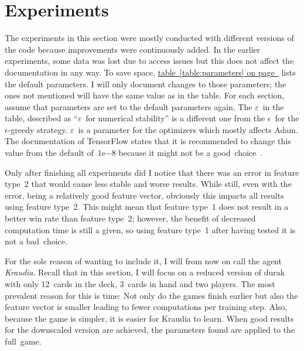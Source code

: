 \documentclass[a4paper,titlepage]{article}
\newcommand{\expn}[2]{{#1}\mathrm{e}{#2}}
\begin{document}
\newpage

\section{Experiments}
\label{sec:experiments}

The experiments in this section were mostly conducted with different versions of the code because improvements were continuously added. In the earlier experiments, some data was lost due to access issues but this does not affect the documentation in any way.
To save space, \hyperref[table:parameters]{table~\ref*{table:parameters} on page~\pageref*{table:parameters}} lists the default parameters.
I will only document changes to those parameters; the ones not mentioned will have the same value as in the table. For each section, assume that parameters are set to the default parameters again. The $\varepsilon$~in the table, described as ``$\varepsilon$~for numerical stability'' is a different one from the $\epsilon$~for the $\epsilon$-greedy strategy. $\varepsilon$~is a parameter for the optimizers which mostly affects Adam. The documentation of TensorFlow states that it is recommended to change this value from the default of~$\expn{1}{-8}$ because it might not be a good~choice~\cite{tfadam}.

Only after finishing all experiments did I notice that there was an error in feature type~2 that would cause less stable and worse results. While still, even with the error, being a relatively good feature vector, obviously this impacts all results using feature type~2. This might mean that feature type~1 does not result in a better win rate than feature type~2; however, the benefit of decreased computation time is still a given, so using feature type~1 after having tested it is not a bad~choice.

For the sole reason of wanting to include it, I will from now on call the agent \emph{Kraudia}.
Recall that in this section, I will focus on a reduced version of durak with only 12~cards in the deck, 3~cards in hand and two players. The most prevalent reason for this is time: Not only do the games finish earlier but also the feature vector is smaller leading to fewer computations per training step.
Also, because the game is simpler, it is easier for Kraudia to learn. When good results for the downscaled version are achieved, the parameters found are applied to the full~game.
\end{document}
